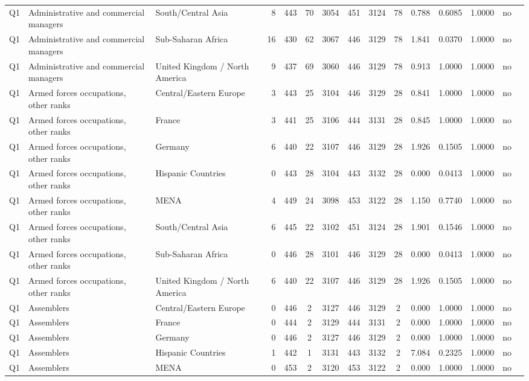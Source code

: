 \begin{longtable}{lllrcccccccccll}
Q1 & Administrative and commercial managers & South/Central Asia & 8 & 443 & 70 & 3054 & 451 & 3124 & 78 & 0.788 & 0.6085 & 1.0000 & no \\
Q1 & Administrative and commercial managers & Sub-Saharan Africa & 16 & 430 & 62 & 3067 & 446 & 3129 & 78 & 1.841 & 0.0370 & 1.0000 & no \\
Q1 & Administrative and commercial managers & United Kingdom / North America & 9 & 437 & 69 & 3060 & 446 & 3129 & 78 & 0.913 & 1.0000 & 1.0000 & no \\
Q1 & Armed forces occupations, other ranks & Central/Eastern Europe & 3 & 443 & 25 & 3104 & 446 & 3129 & 28 & 0.841 & 1.0000 & 1.0000 & no \\
Q1 & Armed forces occupations, other ranks & France & 3 & 441 & 25 & 3106 & 444 & 3131 & 28 & 0.845 & 1.0000 & 1.0000 & no \\
Q1 & Armed forces occupations, other ranks & Germany & 6 & 440 & 22 & 3107 & 446 & 3129 & 28 & 1.926 & 0.1505 & 1.0000 & no \\
Q1 & Armed forces occupations, other ranks & Hispanic Countries & 0 & 443 & 28 & 3104 & 443 & 3132 & 28 & 0.000 & 0.0413 & 1.0000 & no \\
Q1 & Armed forces occupations, other ranks & MENA & 4 & 449 & 24 & 3098 & 453 & 3122 & 28 & 1.150 & 0.7740 & 1.0000 & no \\
Q1 & Armed forces occupations, other ranks & South/Central Asia & 6 & 445 & 22 & 3102 & 451 & 3124 & 28 & 1.901 & 0.1546 & 1.0000 & no \\
Q1 & Armed forces occupations, other ranks & Sub-Saharan Africa & 0 & 446 & 28 & 3101 & 446 & 3129 & 28 & 0.000 & 0.0413 & 1.0000 & no \\
Q1 & Armed forces occupations, other ranks & United Kingdom / North America & 6 & 440 & 22 & 3107 & 446 & 3129 & 28 & 1.926 & 0.1505 & 1.0000 & no \\
Q1 & Assemblers & Central/Eastern Europe & 0 & 446 & 2 & 3127 & 446 & 3129 & 2 & 0.000 & 1.0000 & 1.0000 & no \\
Q1 & Assemblers & France & 0 & 444 & 2 & 3129 & 444 & 3131 & 2 & 0.000 & 1.0000 & 1.0000 & no \\
Q1 & Assemblers & Germany & 0 & 446 & 2 & 3127 & 446 & 3129 & 2 & 0.000 & 1.0000 & 1.0000 & no \\
Q1 & Assemblers & Hispanic Countries & 1 & 442 & 1 & 3131 & 443 & 3132 & 2 & 7.084 & 0.2325 & 1.0000 & no \\
Q1 & Assemblers & MENA & 0 & 453 & 2 & 3120 & 453 & 3122 & 2 & 0.000 & 1.0000 & 1.0000 & no \\

\end{longtable}
